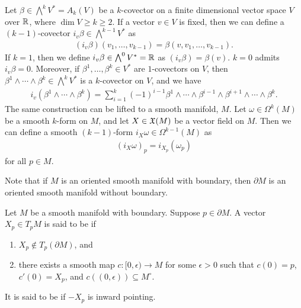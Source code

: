 Let $\beta \in \bigwedge^{k} V^{\ast} = A_{k}(V)$ be a $k$-covector on a finite dimensional vector space $V$ over $\mathbb{R}$, where $\dim V \geq k \geq 2$. If a vector $v \in V$ is fixed, then we can define a $(k-1)$-covector $i_{v}\beta \in \bigwedge^{k-1} V^{\ast}$ as
\begin{align}
    (i_{v}\beta)(v_{1},\ldots,v_{k-1}) = \beta(v,v_{1},\ldots,v_{k-1}).
\end{align}
If $k = 1$, then we define $i_{v}\beta \in \bigwedge^{0} V^{\ast} = \mathbb{R}$ as $(i_{v}\beta) = \beta(v)$. $k = 0$ admits $i_{v}\beta = 0$. Moreover, if $\beta^{1},\ldots,\beta^{k} \in V^{\ast}$ are $1$-covectors on $V$, then $\beta^{1} \wedge \cdots \wedge \beta^{k} \in \bigwedge^{k} V^{\ast}$ is a $k$-covector on $V$, and we have
\begin{align}
    i_{v}(\beta^{1} \wedge \cdots \wedge \beta^{k}) = \sum_{i=1}^{k} (-1)^{i-1} \beta^{1} \wedge \cdots \wedge \beta^{i-1} \wedge \beta^{i+1} \wedge \cdots \wedge \beta^{k}.
\end{align}
The same construction can be lifted to a smooth manifold, $M$. Let $\omega \in \Omega^{k}(M)$ be a smooth $k$-form on $M$, and let $X \in \mathfrak{X}(M)$ be a vector field on $M$. Then we can define a smooth $(k-1)$-form $i_{X}\omega \in \Omega^{k-1}(M)$ as
\begin{align}
    (i_{X}\omega)_{p} = i_{X_{p}}(\omega_{p})
\end{align}
for all $p \in M$.

Note that if $M$ is an oriented smooth manifold with boundary, then $\partial M$ is an oriented smooth manifold without boundary.
\begin{definition}
    Let $M$ be a smooth manifold with boundary. Suppose $p \in \partial M$. A vector $X_{p} \in T_{p}M$ is said to be  if
    \begin{enumerate}
        \item $X_{p} \notin T_{p}(\partial M)$, and
        \item there exists a smooth map $c:[0,\epsilon) \to M$ for some $\epsilon > 0$ such that $c(0) = p$, $c'(0) = X_{p}$, and $c((0,\epsilon)) \subseteq M^{\circ}$.
    \end{enumerate}
    It is said to be  if $-X_{p}$ is inward pointing.
\end{definition}

